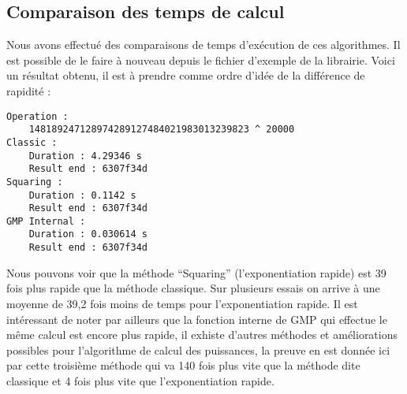 \subsection{Comparaison des temps de calcul}
Nous avons effectué des comparaisons de temps d'exécution de ces algorithmes. Il est possible de le faire à nouveau depuis le fichier d’exemple de la librairie. Voici un résultat obtenu, il est à prendre comme ordre d’idée de la différence de rapidité :

\begin{lstlisting}
Operation :
	148189247128974289127484021983013239823 ^ 20000
Classic :
	Duration : 4.29346 s
	Result end : 6307f34d
Squaring :
	Duration : 0.1142 s
	Result end : 6307f34d
GMP Internal :
	Duration : 0.030614 s
	Result end : 6307f34d
\end{lstlisting}

Nous pouvons voir que la méthode “Squaring” (l’exponentiation rapide) est 39 fois plus rapide que la méthode classique. Sur plusieurs essais on arrive à une moyenne de 39,2 fois moins de temps pour l’exponentiation rapide. Il est intéressant de noter par ailleurs que la fonction interne de GMP qui effectue le même calcul est encore plus rapide, il exhiste d’autres méthodes et améliorations possibles pour l’algorithme de calcul des puissances, la preuve en est donnée ici par cette troisième méthode qui va 140 fois plus vite que la méthode dite classique et 4 fois plus vite que l’exponentiation rapide.
